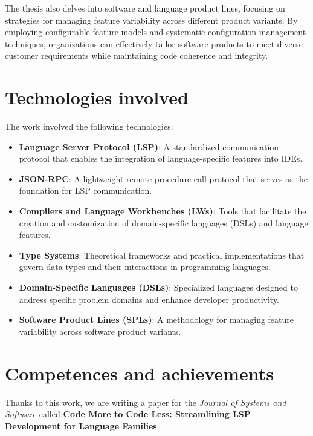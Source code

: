 \documentclass{adapt-lab}
\begin{document}
The thesis also delves into software and language product lines, focusing on strategies for managing feature variability across different product variants. By employing configurable feature models and systematic configuration management techniques, organizations can effectively tailor software products to meet diverse customer requirements while maintaining code coherence and integrity.

\section{Technologies involved}

The work involved the following technologies:
\begin{itemize}
    \item \textbf{Language Server Protocol (LSP)}: A standardized communication protocol that enables the integration of language-specific features into IDEs.
    \item \textbf{JSON-RPC}: A lightweight remote procedure call protocol that serves as the foundation for LSP communication.
    \item \textbf{Compilers and Language Workbenches (LWs)}: Tools that facilitate the creation and customization of domain-specific languages (DSLs) and language features.
    \item \textbf{Type Systems}: Theoretical frameworks and practical implementations that govern data types and their interactions in programming languages.
    \item \textbf{Domain-Specific Languages (DSLs)}: Specialized languages designed to address specific problem domains and enhance developer productivity.
    \item \textbf{Software Product Lines (SPLs)}: A methodology for managing feature variability across software product variants.
\end{itemize}

\section{Competences and achievements}

Thanks to this work, we are writing a paper for the \textit{Journal of Systems and Software} called \textbf{Code More to Code Less: Streamlining LSP Development for Language Families}.
\end{document}
